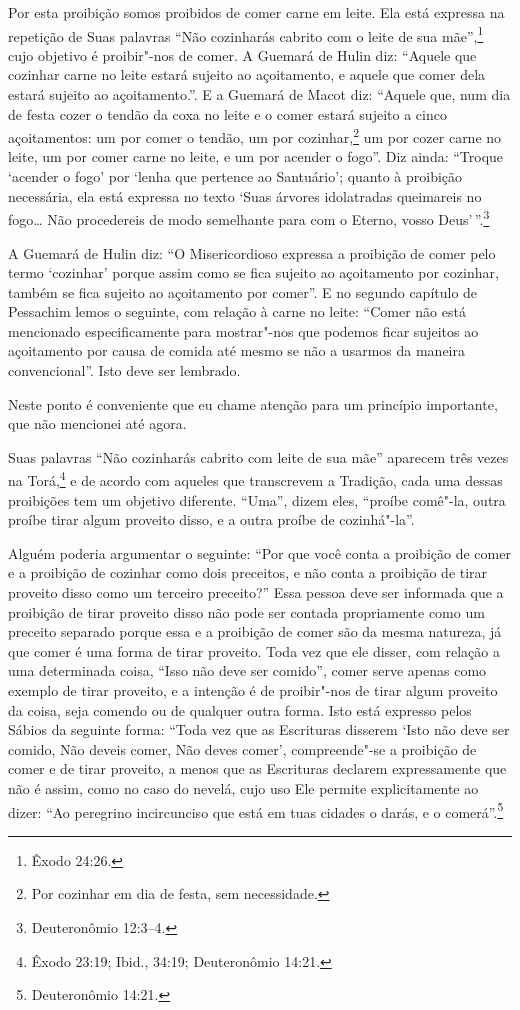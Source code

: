 \begin{multicols}{2}
Por esta proibição somos proibidos de comer carne em leite. Ela está
expressa na repetição de Suas palavras ``Não cozinharás cabrito com o
leite de sua mãe'',\footnote{Êxodo 24:26.} cujo objetivo é proibir"-nos de comer.
A Guemará\starr{} de Hulin\starr{} diz: ``Aquele que cozinhar carne no leite estará
sujeito ao açoitamento, e aquele que comer dela estará sujeito ao
açoitamento.''. E a Guemará\starr{} de Macot\starr{} diz: ``Aquele que, num dia de festa
cozer o tendão da coxa no leite e o comer estará sujeito a cinco
açoitamentos: um por comer o tendão, um por
cozinhar,\footnote{Por cozinhar em dia de festa, sem necessidade.} um por cozer carne no leite, um por
comer carne no leite, e um por acender o fogo''. Diz ainda: ``Troque
`acender o fogo' por `lenha que pertence ao Santuário'; quanto à
proibição necessária, ela está expressa no texto `Suas árvores
idolatradas queimareis no fogo\ldots{} Não procedereis de modo semelhante
para com o Eterno, vosso Deus'\,''.\footnote{Deuteronômio 12:3--4.}

A Guemará\starr{} de Hulin\starr{} diz: ``O Misericordioso expressa a proibição de comer
pelo termo `cozinhar' porque assim como se fica sujeito ao açoitamento
por cozinhar, também se fica sujeito ao açoitamento por comer''. E no
segundo capítulo de Pessachim\starr{} lemos o seguinte, com relação à carne no
leite: ``Comer não está mencionado especificamente para mostrar"-nos que
podemos ficar sujeitos ao açoitamento por causa de comida até mesmo se
não a usarmos da maneira convencional''. Isto deve ser lembrado.

Neste ponto é conveniente que eu chame atenção para um princípio
importante, que não mencionei até agora.

Suas palavras ``Não cozinharás cabrito com leite de sua mãe'' aparecem
três vezes na Torá\starr,\footnote{Êxodo 23:19; Ibid., 34:19; Deuteronômio 14:21.} e de acordo com aqueles que
transcrevem a Tradição, cada uma dessas proibições tem um objetivo
diferente. ``Uma'', dizem eles, ``proíbe comê"-la, outra proíbe tirar
algum proveito disso, e a outra proíbe de cozinhá"-la''.

Alguém poderia argumentar o seguinte: ``Por que você conta a proibição
de comer e a proibição de cozinhar como dois preceitos, e não conta a
proibição de tirar proveito disso como um terceiro preceito?'' Essa
pessoa deve ser informada que a proibição de tirar proveito disso não
pode ser contada propriamente como um preceito separado porque essa e a
proibição de comer são da mesma natureza, já que comer é uma forma de
tirar proveito. Toda vez que ele disser, com relação a uma determinada
coisa, ``Isso não deve ser comido'', comer serve apenas como exemplo de
tirar proveito, e a intenção é de proibir"-nos de tirar algum proveito da
coisa, seja comendo ou de qualquer outra forma. Isto está expresso pelos
Sábios da seguinte forma: ``Toda vez que as Escrituras disserem `Isto
não deve ser comido, Não deveis comer, Não deves comer', compreende"-se a
proibição de comer e de tirar proveito, a menos que as Escrituras
declarem expressamente que não é assim, como no caso do nevelá\starr, cujo
uso Ele permite explicitamente ao dizer: ``Ao peregrino incircunciso que está em tuas cidades o darás, e o comerá''.\footnote{Deuteronômio 14:21.}


\end{multicols}
